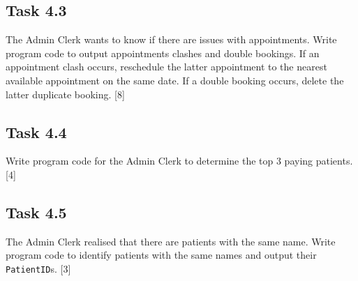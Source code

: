 \subsection*{Task 4.3}

The Admin Clerk wants to know if there are issues with appointments.
Write program code to output appointments clashes and double bookings.
If an appointment clash occurs, reschedule the latter appointment
to the nearest available appointment on the same date. If a double
booking occurs, delete the latter duplicate booking. \hfill{}{[}8{]}

\subsection*{Task 4.4 }

Write program code for the Admin Clerk to determine the top 3 paying
patients. \hfill{} {[}4{]}

\subsection*{Task 4.5 }

The Admin Clerk realised that there are patients with the same name.
Write program code to identify patients with the same names and output
their \texttt{PatientID}s. \hfill{} {[}3{]}